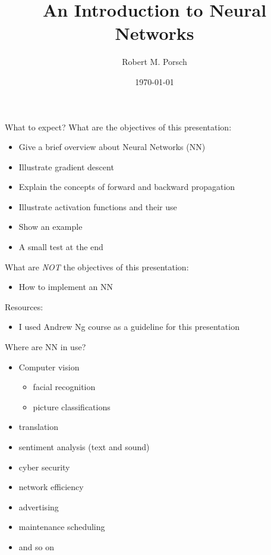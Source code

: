 \documentclass{beamer}
\title{An Introduction to Neural Networks}
\date{\today}
\author{Robert M. Porsch}
\institute{Center of Genomic Science}
\begin{document}
\maketitle

\begin{frame}[t]{What to expect?}
  What are the objectives of this presentation:
  \begin{itemize}
    \item Give a brief overview about Neural Networks (NN)
    \item Illustrate gradient descent
    \item Explain the concepts of forward and backward propagation
    \item Illustrate activation functions and their use
    \item Show an example
    \item A small test at the end
  \end{itemize}
  What are \emph{NOT} the objectives of this presentation:
  \begin{itemize}
    \item How to implement an NN
  \end{itemize}
  Resources:
  \begin{itemize}
    \item I used Andrew Ng course as a guideline for this presentation
  \end{itemize}
\end{frame}

\begin{frame}[t]{Where are NN in use?}
  \begin{itemize}
    \item Computer vision
      \begin{itemize}
        \item facial recognition
        \item picture classifications
      \end{itemize}
      \item translation
      \item sentiment analysis (text and sound)
      \item cyber security
      \item network efficiency
      \item advertising
      \item maintenance scheduling
      \item and so on
  \end{itemize}
\end{frame}
\end{document}
